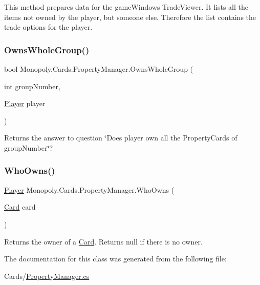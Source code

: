 This method prepares data for the game\+Window\textquotesingle{}s Trade\+Viewer. It lists all the items not owned by the player, but someone else. Therefore the list contains the trade options for the player. \mbox{\label{class_monopoly_1_1_cards_1_1_property_manager_aca5228c00fd5f7812b754c6c46815d17}} 
\subsubsection{\texorpdfstring{Owns\+Whole\+Group()}{OwnsWholeGroup()}}
{\footnotesize\ttfamily bool Monopoly.\+Cards.\+Property\+Manager.\+Owns\+Whole\+Group (\begin{DoxyParamCaption}\item[{int}]{group\+Number,  }\item[{\mbox{\hyperlink{class_monopoly_1_1_players_1_1_player}{Player}}}]{player }\end{DoxyParamCaption})\hspace{0.3cm}{\ttfamily [inline]}}

Returns the answer to question \char`\"{}\+Does player own all the Property\+Cards of group\+Number\char`\"{}? \mbox{\label{class_monopoly_1_1_cards_1_1_property_manager_a101662b0cffc7b58e86130c2e53766ce}} 
\subsubsection{\texorpdfstring{Who\+Owns()}{WhoOwns()}}
{\footnotesize\ttfamily \mbox{\hyperlink{class_monopoly_1_1_players_1_1_player}{Player}} Monopoly.\+Cards.\+Property\+Manager.\+Who\+Owns (\begin{DoxyParamCaption}\item[{\mbox{\hyperlink{class_monopoly_1_1_cards_1_1_card}{Card}}}]{card }\end{DoxyParamCaption})\hspace{0.3cm}{\ttfamily [inline]}}

Returns the owner of a \mbox{\hyperlink{class_monopoly_1_1_cards_1_1_card}{Card}}. Returns null if there is no owner. 

The documentation for this class was generated from the following file\+:\begin{DoxyCompactItemize}
\item 
Cards/\mbox{\hyperlink{_property_manager_8cs}{Property\+Manager.\+cs}}\end{DoxyCompactItemize}
